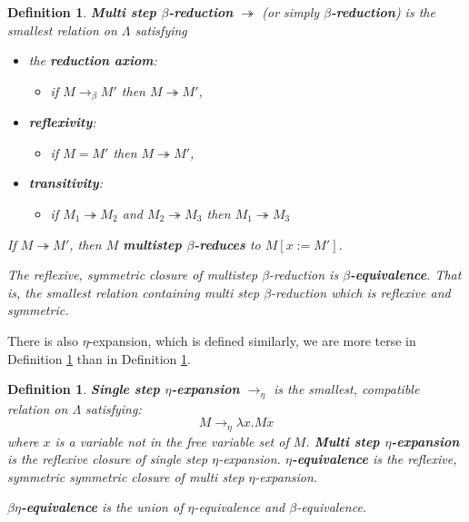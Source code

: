\documentclass[english,letter paper,12pt,leqno]{article}
\newcommand{\lto}{\longrightarrow}
\newtheorem{defn}[theorem]{Definition}
\theoremstyle{example}
\numberwithin{equation}{section}
\begin{document}
\begin{defn}\label{def:beta}
	\textbf{Multi step $\beta$-reduction} $\twoheadrightarrow$ (or simply \textbf{$\beta$-reduction}) is the smallest relation on $\Lambda$ satisfying
	\begin{itemize}
		\item the \textbf{reduction axiom}:
		\begin{itemize}
			\item if $M \to_\beta M'$ then $M \twoheadrightarrow M'$,
		\end{itemize}
		\item \textbf{reflexivity}:
		\begin{itemize}
			\item if $M = M'$ then $M \twoheadrightarrow M'$,
		\end{itemize}
		\item \textbf{transitivity}:
		\begin{itemize}
			\item if $M_1 \twoheadrightarrow M_2$ and $M_2 \twoheadrightarrow M_3$ then $M_1 \twoheadrightarrow M_3$
		\end{itemize}
	\end{itemize}
	If $M \twoheadrightarrow M'$, then $M$ \textbf{multistep $\beta$-reduces} to $M[x := M']$.
	
	The reflexive, symmetric closure of multistep $\beta$-reduction is \textbf{$\beta$-equivalence}. That is, the smallest relation containing multi step $\beta$-reduction which is reflexive and symmetric.
\end{defn}

There is also $\eta$-expansion, which is defined similarly, we are more terse in Definition \ref{def:eta} than in Definition \ref{def:beta}.

\begin{defn}\label{def:eta}
	\textbf{Single step $\eta$-expansion} $\lto_\eta$ is the smallest, compatible relation on $\Lambda$ satisfying:
	\begin{equation}
		M \lto_\eta \lambda x. Mx
	\end{equation}
	where $x$ is a variable not in the free variable set of $M$. \textbf{Multi step $\eta$-expansion} is the reflexive closure of single step $\eta$-expansion. \textbf{$\eta$-equivalence} is the reflexive, symmetric symmetric closure of multi step $\eta$-expansion.
	
	\textbf{$\beta\eta$-equivalence} is the union of $\eta$-equivalence and $\beta$-equivalence.
\end{defn}
\end{document}
